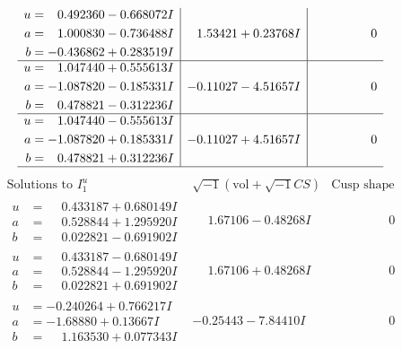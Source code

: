 \documentclass[1p]{elsarticle_modified}
\theoremstyle{definition}
\newcommand{\I}{\sqrt{-1}}
\begin{document}
$$\begin{array}{c|c|c}
\begin{aligned}
u &= \phantom{-}0.492360 - 0.668072 I \\
a &= \phantom{-}1.000830 - 0.736488 I \\
b &= -0.436862 + 0.283519 I\end{aligned}
 & \phantom{-}1.53421 + 0.23768 I & \phantom{-0.000000 } 0 \\ \hline\begin{aligned}
u &= \phantom{-}1.047440 + 0.555613 I \\
a &= -1.087820 - 0.185331 I \\
b &= \phantom{-}0.478821 - 0.312236 I\end{aligned}
 & -0.11027 - 4.51657 I & \phantom{-0.000000 } 0 \\ \hline\begin{aligned}
u &= \phantom{-}1.047440 - 0.555613 I \\
a &= -1.087820 + 0.185331 I \\
b &= \phantom{-}0.478821 + 0.312236 I\end{aligned}
 & -0.11027 + 4.51657 I & \phantom{-0.000000 } 0\\
 \hline 
 \end{array}$$\newpage$$\begin{array}{c|c|c}  
\text{Solutions to }I^u_{1}& \I (\text{vol} + \sqrt{-1}CS) & \text{Cusp shape}\\
 \hline 
\begin{aligned}
u &= \phantom{-}0.433187 + 0.680149 I \\
a &= \phantom{-}0.528844 + 1.295920 I \\
b &= \phantom{-}0.022821 - 0.691902 I\end{aligned}
 & \phantom{-}1.67106 - 0.48268 I & \phantom{-0.000000 } 0 \\ \hline\begin{aligned}
u &= \phantom{-}0.433187 - 0.680149 I \\
a &= \phantom{-}0.528844 - 1.295920 I \\
b &= \phantom{-}0.022821 + 0.691902 I\end{aligned}
 & \phantom{-}1.67106 + 0.48268 I & \phantom{-0.000000 } 0 \\ \hline\begin{aligned}
u &= -0.240264 + 0.766217 I \\
a &= -1.68880 + 0.13667 I \\
b &= \phantom{-}1.163530 + 0.077343 I\end{aligned}
 & -0.25443 - 7.84410 I & \phantom{-0.000000 } 0 \\ \hline\begin{aligned}

\end{aligned}
\end{array}$$
\end{document}
